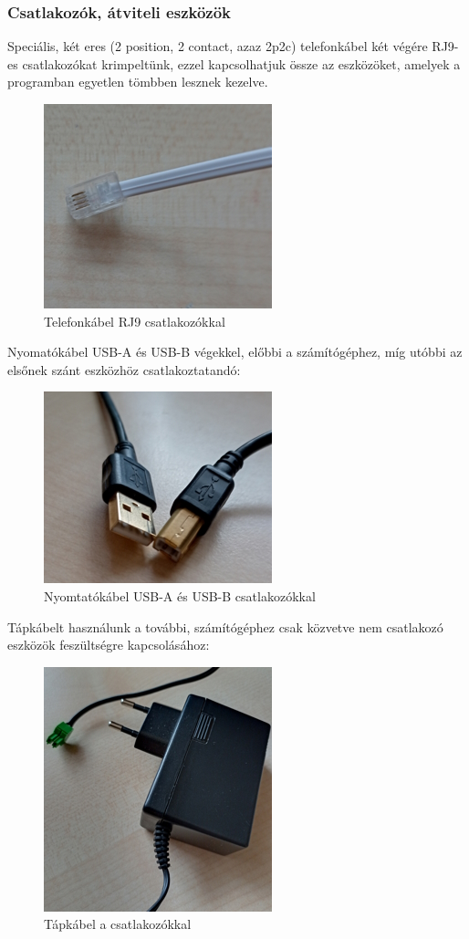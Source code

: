 \documentclass[tocnopagenum]{thesis-ekf}
\begin{document}
	\subsubsection{Csatlakozók, átviteli eszközök}
	Speciális, két eres (2 position, 2 contact, azaz 2p2c) telefonkábel két végére RJ9-es csatlakozókat krimpeltünk, ezzel kapcsolhatjuk össze az eszközöket, amelyek a programban egyetlen tömbben lesznek kezelve.
	
	\begin{figure}[H]
		\centering
		\includegraphics[scale=0.65]{images/foto_rj9.jpg}
		\caption{Telefonkábel RJ9 csatlakozókkal}
		\label{fig:foto_rj9}
	\end{figure}	
	
	Nyomatókábel USB-A és USB-B végekkel, előbbi a számítógéphez, míg utóbbi az elsőnek szánt eszközhöz csatlakoztatandó:
	\begin{figure}[H]
		\centering
		\includegraphics[scale=0.65]{images/foto_usbab.jpg}
		\caption{Nyomtatókábel USB-A és USB-B csatlakozókkal}
		\label{fig:foto_usbab}
	\end{figure}		
	
	Tápkábelt használunk a további, számítógéphez csak közvetve nem csatlakozó eszközök feszültségre kapcsolásához:
	\begin{figure}[H]
		\centering
		\includegraphics[scale=0.65]{images/foto_tapkabel.jpg}
		\caption{Tápkábel a csatlakozókkal}
		\label{fig:foto_tapkabel}
	\end{figure}
\end{document}
